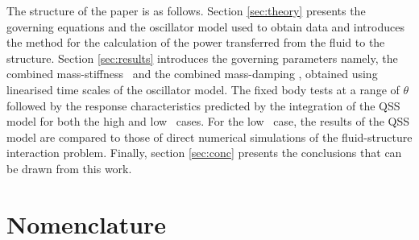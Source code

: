 The structure of the paper is as follows. Section \ref{sec:theory} presents the governing equations and the oscillator model used to obtain data and introduces the method for the calculation of the power transferred from the fluid to the structure. Section \ref{sec:results} introduces the governing parameters namely, the combined mass-stiffness \massstiff \  and the combined mass-damping \massdamp, obtained using linearised time scales of the oscillator model. The fixed body tests at a range of $\theta$ followed by the response characteristics predicted by the integration of the QSS model for both the high and low \reynoldsnumber\ cases. For the low \reynoldsnumber\ case, the results of the QSS model are compared to those of direct numerical simulations of the fluid-structure interaction problem. Finally, section \ref{sec:conc} presents the conclusions that can be drawn from this work.
\section*{Nomenclature}

